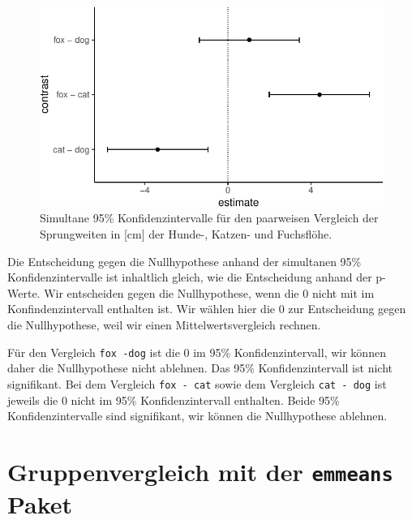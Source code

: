 \documentclass[
  letterpaper,
]{scrbook}
\begin{document}
\begin{figure}[H]

{\centering \includegraphics{./stat-tests-posthoc_files/figure-pdf/fig-multcomp-1-1.pdf}

}

\caption{\label{fig-multcomp-1}Simultane 95\% Konfidenzintervalle für
den paarweisen Vergleich der Sprungweiten in {[}cm{]} der Hunde-,
Katzen- und Fuchsflöhe.}

\end{figure}

Die Entscheidung gegen die Nullhypothese anhand der simultanen 95\%
Konfidenzintervalle ist inhaltlich gleich, wie die Entscheidung anhand
der p-Werte. Wir entscheiden gegen die Nullhypothese, wenn die 0 nicht
mit im Konfindenzintervall enthalten ist. Wir wählen hier die 0 zur
Entscheidung gegen die Nullhypothese, weil wir einen
Mittelwertsvergleich rechnen.

Für den Vergleich \texttt{fox\ -dog} ist die 0 im 95\%
Konfidenzintervall, wir können daher die Nullhypothese nicht ablehnen.
Das 95\% Konfidenzintervall ist nicht signifikant. Bei dem Vergleich
\texttt{fox\ -\ cat} sowie dem Vergleich \texttt{cat\ -\ dog} ist
jeweils die 0 nicht im 95\% Konfidenzintervall enthalten. Beide 95\%
Konfidenzintervalle sind signifikant, wir können die Nullhypothese
ablehnen.

\hypertarget{sec-posthoc-emmeans}{%
\section{\texorpdfstring{Gruppenvergleich mit der \texttt{emmeans}
Paket}{Gruppenvergleich mit der emmeans Paket}}\label{sec-posthoc-emmeans}}

\end{document}
